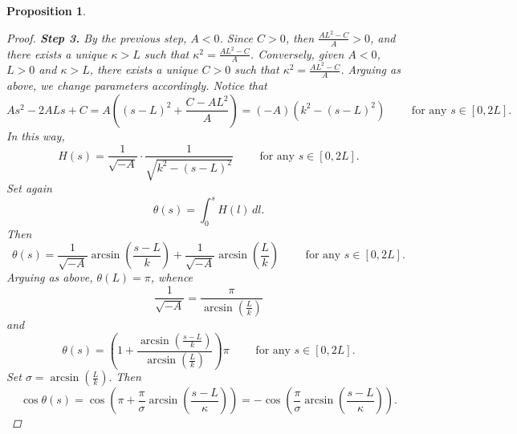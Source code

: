 \documentclass[11pt]{amsart}
\newcommand{\rr}{{\mathbb{R}}}
\renewcommand{\k}{\kappa}
\newtheorem{proposition}[theorem]{Proposition}
\theoremstyle{definition}
\theoremstyle{remark}
\numberwithin{equation}{section}
\begin{document}
\begin{proposition}
\begin{proof}
	\textbf{Step 3.}
	By the previous step, $A<0$. Since $C>0$, then $\frac{AL^2-C}{A}>0$, and there exists a unique $\k>L$ such that $\k^2=\frac{AL^2-C}{A}$. Conversely, given $A<0$, $L>0$ and $\k>L$, there exists a unique $C>0$ such that $\k^2=\frac{AL^2-C}{A}$. Arguing as above, we change parameters accordingly. Notice that
	\begin{equation*}
		As^2-2ALs+C=A\left((s-L)^2+\frac{C-AL^2}{A}\right)=(-A)\left(k^2-(s-L)^2\right)\qquad\text{ for any $s\in[0,2L]$.}
	\end{equation*}
	In this way, 
	\begin{equation*}
		H(s)=\frac{1}{\sqrt{-A}}\cdot\frac{1}{\sqrt{k^2-(s-L)^2}}\qquad\text{ for any $s\in[0,2L]$.}
	\end{equation*}
	Set again  $$\theta(s)=\int_0^s H(l)\,dl.$$ Then
	\begin{equation*}
		\theta(s)=\frac{1}{\sqrt{-A}}\arcsin\left(\frac{s-L}{k}\right)+\frac{1}{\sqrt{-A}}\arcsin\left(\frac{L}{k}\right)\qquad\text{ for any $s\in[0,2L]$.}
	\end{equation*}
	Arguing as above, $\theta(L)=\pi$, whence
	\begin{equation*}
		\frac{1}{\sqrt{-A}}=\frac{\pi}{\arcsin\left(\frac{L}{k}\right)}
	\end{equation*}
	and
	\begin{equation*}
		\theta(s)=\left(1+\frac{\arcsin\left(\frac{s-L}{k}\right)}{\arcsin\left(\frac{L}{k}\right)}\right)\pi\qquad\text{ for any $s\in[0,2L]$.}
	\end{equation*}
	Set $\sigma=\arcsin\left(\frac{L}{k}\right).$ Then
	\begin{equation*}
		\cos\theta(s)=\cos\left(\pi+\frac{\pi}{\sigma}\arcsin\left(\frac{s-L}{\k}\right)\right)=-\cos\left(\frac{\pi}{\sigma}\arcsin\left(\frac{s-L}{\k}\right)\right).

\end{equation*}
\end{proof}
\end{proposition}
\end{document}
